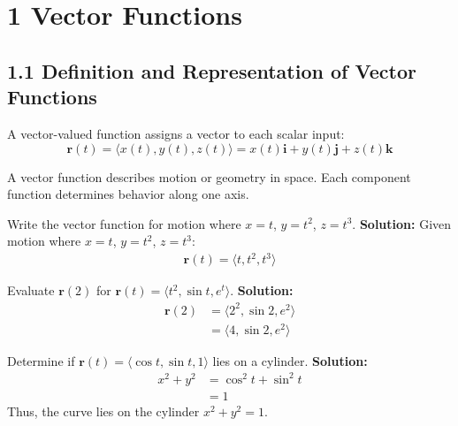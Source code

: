 \section*{1 Vector Functions}
\subsection*{1.1 Definition and Representation of Vector Functions}

\begin{conceptbox}
    A vector-valued function assigns a vector to each scalar input:
    \begin{equation*}
        \mathbf{r}(t) = \langle x(t), y(t), z(t) \rangle = x(t)\mathbf{i} + y(t)\mathbf{j} + z(t)\mathbf{k}
    \end{equation*}
\end{conceptbox}

A vector function describes motion or geometry in space. Each component function determines behavior along one axis.

\begin{examplebox}
    Write the vector function for motion where $x=t$, $y=t^2$, $z=t^3$.
    \newline
    \textbf{Solution:} \newline Given motion where $x=t$, $y=t^2$, $z=t^3$:
    \begin{align*}
        \mathbf{r}(t) = \langle t, t^2, t^3 \rangle
    \end{align*}
\end{examplebox}

\begin{examplebox}
    Evaluate $\mathbf{r}(2)$ for $\mathbf{r}(t)=\langle t^2, \sin t, e^t\rangle$.
    \newline \textbf{Solution:}
    \begin{align*}
        \mathbf{r}(2) & = \langle 2^2, \sin 2, e^2 \rangle \\
                      & = \langle 4, \sin 2, e^2 \rangle
    \end{align*}
\end{examplebox}

\begin{examplebox}
    Determine if $\mathbf{r}(t)=\langle \cos t, \sin t, 1\rangle$ lies on a cylinder.
    \newline \textbf{Solution:}
    \begin{align*}
        x^2 + y^2 & = \cos^2 t + \sin^2 t \\
                  & = 1
    \end{align*}
    Thus, the curve lies on the cylinder $x^2 + y^2 = 1$.
\end{examplebox}